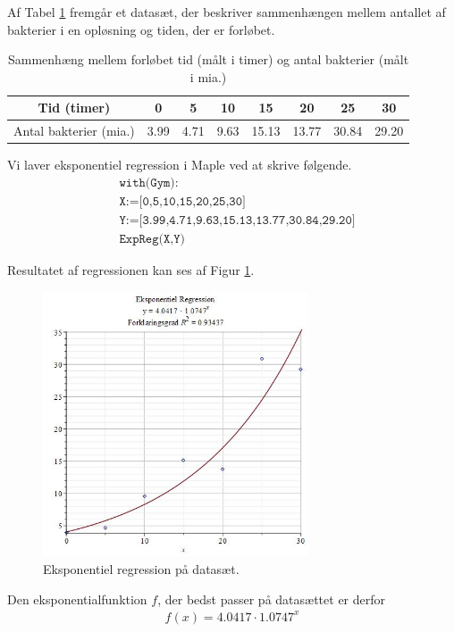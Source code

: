 \begin{exa}
Af Tabel \ref{tab:1} fremgår et datasæt, der beskriver sammenhængen mellem antallet af bakterier i en opløsning og tiden, der er forløbet.
\begin{table}[H]
	\centering
	\begin{tabular}{c|c|c|c|c|c|c|c}
		 Tid (timer) & 0 & 5 & 10 & 15 & 20 & 25 & 30\\
		\hline
		Antal bakterier (mia.) & 3.99 & 4.71 & 9.63 & 15.13 & 13.77 & 30.84 & 29.20
	\end{tabular}
	\caption{Sammenhæng mellem forløbet tid (målt i timer) og antal bakterier (målt i mia.)}
	\label{tab:1}
\end{table}

Vi laver eksponentiel regression i Maple ved at skrive følgende.
\begin{align*}
	&\texttt{with(Gym):}\\
	&\texttt{X:=[0,5,10,15,20,25,30]}\\
	&\texttt{Y:=[3.99,4.71,9.63,15.13,13.77,30.84,29.20]}\\
	&\texttt{ExpReg(X,Y)}
\end{align*}

Resultatet af regressionen kan ses af Figur \ref{fig:regres}.
\begin{figure}[H]
	\centering
	\includegraphics[width=0.7\textwidth]{Billeder/EkspReg.jpg}
	\caption{Eksponentiel regression på datasæt.}
	\label{fig:regres}
\end{figure}
Den eksponentialfunktion $f$, der bedst passer på datasættet er derfor
\begin{align*}
	f(x) = 4.0417\cdot 1.0747^x
\end{align*}

\end{exa}

